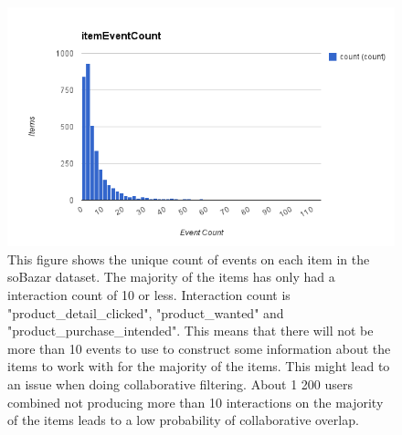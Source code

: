 
    \begin{figure}[H]
        \includegraphics[width=5in]{image/item-event-count.png}
        \centering
        \caption[Count of events on each unique item]{This figure shows the unique count of events on each item in the soBazar dataset.
        The majority of the items has only had a interaction count of 10 or less.
        Interaction count is "product\_detail\_clicked", "product\_wanted" and "product\_purchase\_intended".
        This means that there will not be more than 10 events to use to construct some information about the items to work with for the majority of the items.
        This might lead to an issue when doing collaborative filtering.
        About 1 200 users combined not producing more than 10 interactions on the majority of the items leads to a low probability of collaborative overlap.}
    \end{figure}

